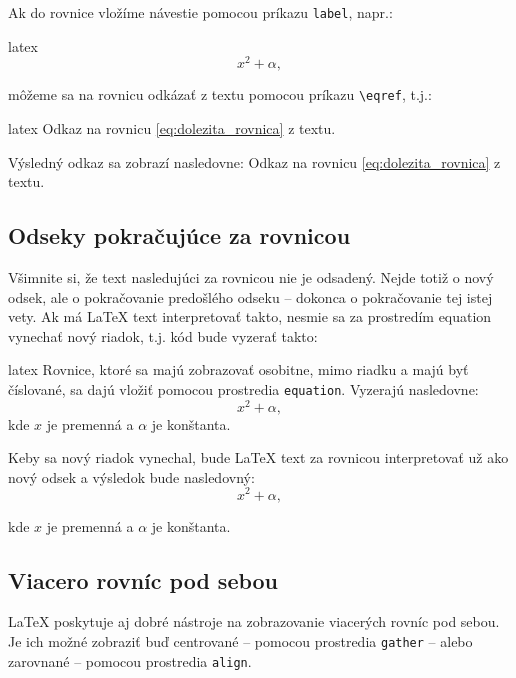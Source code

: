 Ak do rovnice vložíme návestie pomocou príkazu \texttt{label}, napr.:
\begin{inlinecode}{latex}
\begin{equation}
x^2 + \alpha,
\label{eq:dolezita_rovnica}
\end{equation}
\end{inlinecode}
môžeme sa na rovnicu odkázať z textu pomocou príkazu \texttt{{\textbackslash}eqref}, t.j.:
\begin{inlinecode}{latex}
Odkaz na rovnicu \eqref{eq:dolezita_rovnica} z textu.
\end{inlinecode}

Výsledný odkaz sa zobrazí nasledovne: Odkaz na rovnicu \eqref{eq:dolezita_rovnica} z textu.

\subsection{Odseky pokračujúce za rovnicou}

Všimnite si, že text nasledujúci za rovnicou nie je odsadený. Nejde totiž o nový odsek, ale o pokračovanie predošlého odseku -- dokonca o pokračovanie tej istej vety. Ak má LaTeX text interpretovať takto, nesmie sa za prostredím equation vynechať nový riadok, t.j. kód bude vyzerať takto:
\begin{inlinecode}{latex}
Rovnice, ktoré sa majú zobrazovať osobitne, mimo riadku a majú byť číslované, sa dajú vložiť pomocou prostredia \texttt{equation}. Vyzerajú nasledovne:
\begin{equation}
x^2 + \alpha,
\end{equation}
kde $x$ je premenná a $\alpha$ je konštanta.
\end{inlinecode}

Keby sa nový riadok vynechal, bude LaTeX text za rovnicou interpretovať už ako nový odsek a výsledok bude nasledovný:
\begin{equation}
x^2 + \alpha,
\end{equation}
	
kde $x$ je premenná a $\alpha$ je konštanta.

\subsection{Viacero rovníc pod sebou}

LaTeX poskytuje aj dobré nástroje na zobrazovanie viacerých rovníc pod sebou. Je ich možné zobraziť buď centrované -- pomocou prostredia \texttt{gather} -- alebo zarovnané -- pomocou prostredia \texttt{align}.

